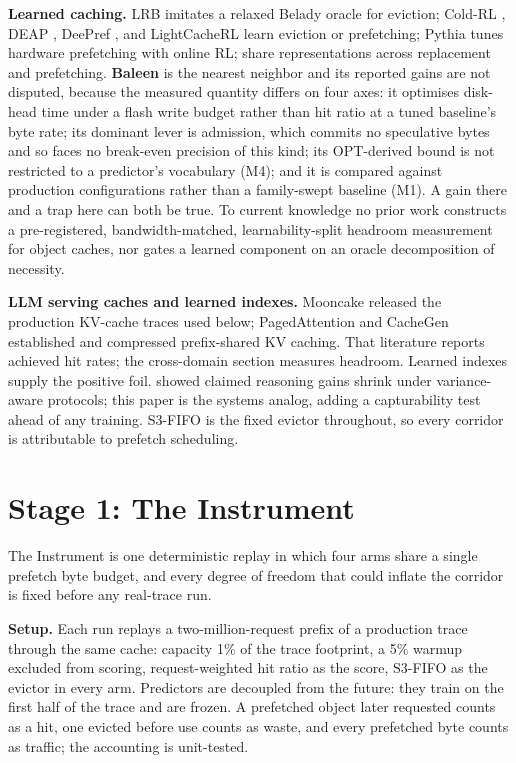 \documentclass[letterpaper]{article} %
\begin{document}
\textbf{Learned caching.} LRB \citep{lrb} imitates a relaxed Belady oracle for eviction; Cold-RL \citep{coldrl}, DEAP \citep{deap}, DeePref \citep{deepref}, and LightCacheRL \citep{lightcache} learn eviction or prefetching; Pythia \citep{pythia} tunes hardware prefetching with online RL; \citet{jointhw} share representations across replacement and prefetching. \textbf{Baleen} \citep{baleen} is the nearest neighbor and its reported gains are not disputed, because the measured quantity differs on four axes: it optimises disk-head time under a flash write budget rather than hit ratio at a tuned baseline's byte rate; its dominant lever is admission, which commits no speculative bytes and so faces no break-even precision of this kind; its OPT-derived bound is not restricted to a predictor's vocabulary (M4); and it is compared against production configurations rather than a family-swept baseline (M1). A gain there and a trap here can both be true. To current knowledge no prior work constructs a pre-registered, bandwidth-matched, learnability-split headroom measurement for object caches, nor gates a learned component on an oracle decomposition of necessity.

\textbf{LLM serving caches and learned indexes.} Mooncake \citep{mooncake} released the production KV-cache traces used below; PagedAttention \citep{vllm} and CacheGen \citep{cachegen} established and compressed prefix-shared KV caching. That literature reports achieved hit rates; the cross-domain section measures headroom. Learned indexes \citep{kraska,sosd} supply the positive foil. \citet{sober} showed claimed reasoning gains shrink under variance-aware protocols; this paper is the systems analog, adding a capturability test ahead of any training. S3-FIFO \citep{s3fifo} is the fixed evictor throughout, so every corridor is attributable to prefetch scheduling.

\section{Stage 1: The Instrument}
The Instrument is one deterministic replay in which four arms share a single prefetch byte budget, and every degree of freedom that could inflate the corridor is fixed before any real-trace run.

\textbf{Setup.} Each run replays a two-million-request prefix of a production trace through the same cache: capacity 1\% of the trace footprint, a 5\% warmup excluded from scoring, request-weighted hit ratio as the score, S3-FIFO as the evictor in every arm. Predictors are decoupled from the future: they train on the first half of the trace and are frozen. A prefetched object later requested counts as a hit, one evicted before use counts as waste, and every prefetched byte counts as traffic; the accounting is unit-tested.
\end{document}
